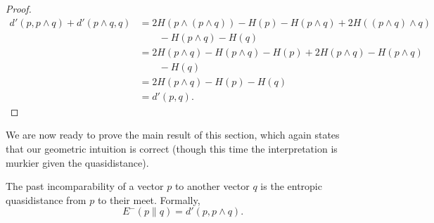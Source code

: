 \begin{proof}
    \begin{align}
        d'(p, p \wedge q) + d'(p \wedge q, q) &= 2H(p \wedge (p \wedge q)) - H(p) - H(p \wedge q) + 2H((p \wedge q) \wedge q) \nonumber\\
        &\quad \quad - H(p \wedge q) - H(q)\\
        &= 2H(p \wedge q) - H(p \wedge q) - H(p) + 2H(p \wedge q) - H(p \wedge q)\nonumber\\
        &\quad \quad - H(q) \\
        &= 2H(p \wedge q) - H(p) - H(q) \\
        &= d'(p, q).
    \end{align} \phantom{\qedhere}
\end{proof}

We are now ready to prove the main result of this section, which again states that our geometric intuition is correct (though this time the interpretation is murkier given the quasidistance).

\begin{theorem}
    The past incomparability of a vector $p$ to another vector $q$ is the entropic quasidistance from $p$ to their meet. Formally,
    \begin{equation}
        E^- (p \parallel q) = d'(p, p \wedge q).
    \end{equation}
\end{theorem}

